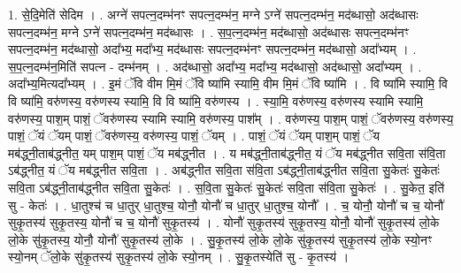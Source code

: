 \documentclass[17pt]{extarticle}
\begin{document}
1. से॒दि॒मेति॑ सेदिम । . अग्ने॑ सपत्न॒दम्भ॑नꣳ सपत्न॒दम्भ॑न॒ मग्ने ऽग्ने॑ सपत्न॒दम्भ॑न॒ मद॑ब्धासो॒ अद॑ब्धासः सपत्न॒दम्भ॑न॒ मग्ने ऽग्ने॑ सपत्न॒दम्भ॑न॒ मद॑ब्धासः । . स॒प॒त्न॒दम्भ॑न॒ मद॑ब्धासो॒ अद॑ब्धासः सपत्न॒दम्भ॑नꣳ सपत्न॒दम्भ॑न॒ मद॑ब्धासो॒ अदा᳚भ्य॒ मदा᳚भ्य॒ मद॑ब्धासः सपत्न॒दम्भ॑नꣳ सपत्न॒दम्भ॑न॒ मद॑ब्धासो॒ अदा᳚भ्यम् । . स॒प॒त्न॒दम्भ॑न॒मिति॑ सपत्न - दम्भ॑नम् । . अद॑ब्धासो॒ अदा᳚भ्य॒ मदा᳚भ्य॒ मद॑ब्धासो॒ अद॑ब्धासो॒ अदा᳚भ्यम् । . अदा᳚भ्य॒मित्यदा᳚भ्यम् । . इ॒मं ॅवि वीम मि॒मं ॅवि ष्या॑मि स्यामि॒ वीम मि॒मं ॅवि ष्या॑मि । . वि ष्या॑मि स्यामि॒ वि वि ष्या॑मि॒ वरु॑णस्य॒ वरु॑णस्य स्यामि॒ वि वि ष्या॑मि॒ वरु॑णस्य । . स्या॒मि॒ वरु॑णस्य॒ वरु॑णस्य स्यामि स्यामि॒ वरु॑णस्य॒ पाश॒म् पाशं॒ ॅवरु॑णस्य स्यामि स्यामि॒ वरु॑णस्य॒ पाश᳚म् । . वरु॑णस्य॒ पाश॒म् पाशं॒ ॅवरु॑णस्य॒ वरु॑णस्य॒ पाशं॒ ॅयं ॅयम् पाशं॒ ॅवरु॑णस्य॒ वरु॑णस्य॒ पाशं॒ ॅयम् । . पाशं॒ ॅयं ॅयम् पाश॒म् पाशं॒ ॅय मब॑द्ध्नी॒ताब॑द्ध्नीत॒ यम् पाश॒म् पाशं॒ ॅय मब॑द्ध्नीत । . य मब॑द्ध्नी॒ताब॑द्ध्नीत॒ यं ॅय मब॑द्ध्नीत सवि॒ता स॑वि॒ता ऽब॑द्ध्नीत॒ यं ॅय मब॑द्ध्नीत सवि॒ता । . अब॑द्ध्नीत सवि॒ता स॑वि॒ता ऽब॑द्ध्नी॒ताब॑द्ध्नीत सवि॒ता सु॒केतः॑ सु॒केतः॑ सवि॒ता ऽब॑द्ध्नी॒ताब॑द्ध्नीत सवि॒ता सु॒केतः॑ । . स॒वि॒ता सु॒केतः॑ सु॒केतः॑ सवि॒ता स॑वि॒ता सु॒केतः॑ । . सु॒केत॒ इति॑ सु - केतः॑ । . धा॒तुश्च॑ च धा॒तुर् धा॒तुश्च॒ योनौ॒ योनौ॑ च धा॒तुर् धा॒तुश्च॒ योनौ᳚ । . च॒ योनौ॒ योनौ॑ च च॒ योनौ॑ सुकृ॒तस्य॑ सुकृ॒तस्य॒ योनौ॑ च च॒ योनौ॑ सुकृ॒तस्य॑ । . योनौ॑ सुकृ॒तस्य॑ सुकृ॒तस्य॒ योनौ॒ योनौ॑ सुकृ॒तस्य॑ लो॒के लो॒के सु॑कृ॒तस्य॒ योनौ॒ योनौ॑ सुकृ॒तस्य॑ लो॒के । . सु॒कृ॒तस्य॑ लो॒के लो॒के सु॑कृ॒तस्य॑ सुकृ॒तस्य॑ लो॒के स्यो॒नꣳ स्यो॒नम् ॅलो॒के सु॑कृ॒तस्य॑ सुकृ॒तस्य॑ लो॒के स्यो॒नम् । . सु॒कृ॒तस्येति॑ सु - कृ॒तस्य॑ । \newline
\end{document}
